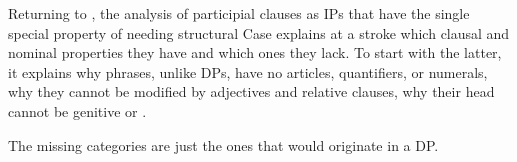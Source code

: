 \documentclass[output=paper,
modfonts
]{LSP/langsci}
\begin{document}
Returning to , the analysis of participial clauses as IPs that have the single special
property of needing structural Case explains at a stroke which clausal and nominal properties
they have and which ones they lack.  To start with the latter, it explains why  phrases,
unlike DPs, have no articles, quantifiers, or numerals, why they cannot be modified by
adjectives and relative clauses, why their head cannot be genitive or
.\begin{exe}
\ex\label{noo}\label{ex:kip:5}
	\begin{xlist}
	\end{xlist}
\end{exe}
The missing categories are just the ones that would originate in a DP.
\end{document}
